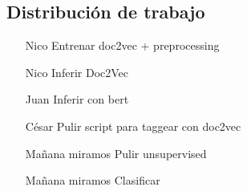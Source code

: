 \documentclass[12pt]{article}
\begin{document}
\subsection{Distribución de trabajo}
\begin{itemize}
    \item [Nico] Entrenar doc2vec + preprocessing
    \item [Nico] Inferir Doc2Vec
    \item [Juan] Inferir con bert
    \item [César] Pulir script para taggear con doc2vec
    \item [Mañana miramos] Pulir unsupervised
    \item [Mañana miramos] Clasificar
\end{itemize}

\newpage


\end{document}
